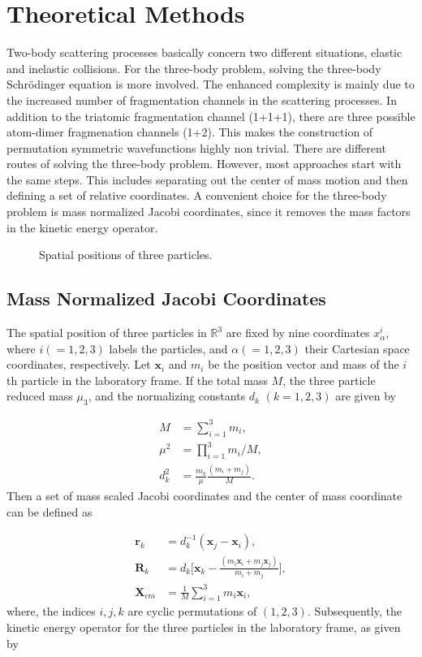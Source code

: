 \documentclass{article}
\begin{document}
\section{Theoretical Methods} 
Two-body scattering processes basically concern two different situations, elastic and inelastic collisions. For the three-body problem, solving the three-body Schr{\"o}dinger equation is more involved. The enhanced complexity is mainly due to the increased number of fragmentation channels in the scattering processes. In addition to the triatomic fragmentation channel (1+1+1), there are three possible atom-dimer fragmenation channels (1+2). This makes the construction of permutation symmetric wavefunctions highly non trivial. There are different routes of solving the three-body problem. However, most approaches start with the same steps. This includes separating out the  center of mass motion and then defining a set of relative  coordinates. A convenient choice for the three-body problem is mass normalized Jacobi coordinates, since it removes the mass factors in the kinetic energy operator.     

\begin{figure}
	\centering
	
	\caption{Spatial positions of three particles.}
	\label{fig:1}
\end{figure}

\subsection{Mass Normalized Jacobi Coordinates}
The spatial position of three particles in $\mathbb{R}^3$ are fixed by nine coordinates $x_{\alpha}^{i}$, where $i(=1,2,3)$ labels the particles, and $\alpha(=1,2,3)$ their Cartesian space coordinates, respectively. Let $\mathbf{x}_i$ and $m_{i}$ be the position vector and mass of the $i$th particle in the laboratory frame. If the total mass $M$, the three particle reduced mass $\mu_{3}$, and the normalizing constants $d_{k}$ $(k=1,2,3)$ are given by 

\begin{align}
M &= \sum_{i=1}^{3}m_i,  \label{eq:3,1} \\
\mu^2 &= \prod_{i=1}^{3}m_i/M,  \label{eq:3,2}\\
d_k^2 &= \frac{m_k}{\mu}\frac{(m_i+m_j)}{M}.  \label{eq:3,3}
\end{align}
Then a set of mass scaled Jacobi coordinates and the center of mass coordinate can be defined as

\begin{align}
\mathbf{r}_k &= d^{-1}_k(\mathbf{x}_{j}-\mathbf{x}_{i}),  \label{eq:4,1} \\
\mathbf{R}_k &= d_k\Big[\mathbf{x}_{k}-\frac{(m_{i}\mathbf{x}_{i}+m_{j}\mathbf{x}_{j})}{m_{i}+m_{j}}\Big],  \label{eq:4,2}\\
\mathbf{X}_{cm} &= \frac{1}{M} \sum_{i=1}^{3} m_{i} \mathbf{x}_{i},  \label{eq:4,3}
\end{align}   
where, the indices $i,j,k$ are cyclic permutations of $(1,2,3)$. Subsequently, the kinetic energy operator for the three particles in the laboratory frame, as given by 
\end{document}

